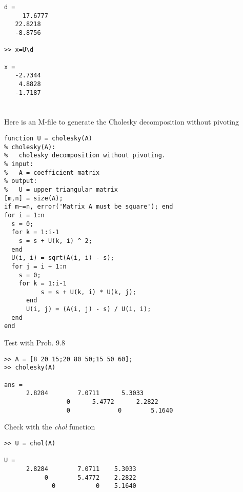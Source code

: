 \documentclass[../main.tex]{subfiles}
\begin{document}
\begin{enumerate}[label=\bfseries(\alph*)]
\begin{lstlisting}[numbers=none]
d =
	 17.6777
   22.8218
   -8.8756
   
>> x=U\d

x =
   -2.7344
    4.8828
   -1.7187
\end{lstlisting}
\bigbreak
\section{}
Here is an M-file to generate the Cholesky decomposition without pivoting
\bigbreak
\begin{lstlisting}[numbers=none]
function U = cholesky(A)
% cholesky(A):
%   cholesky decomposition without pivoting.
% input:
%   A = coefficient matrix
% output:
%   U = upper triangular matrix
[m,n] = size(A);
if m~=n, error('Matrix A must be square'); end
for i = 1:n
  s = 0;
  for k = 1:i-1
    s = s + U(k, i) ^ 2;
  end
  U(i, i) = sqrt(A(i, i) - s);
  for j = i + 1:n
    s = 0;
    for k = 1:i-1
		  s = s + U(k, i) * U(k, j);
 	  end
	  U(i, j) = (A(i, j) - s) / U(i, i);
  end
end 
\end{lstlisting}
\bigbreak
Test with Prob. $9.8$
\bigbreak
\begin{lstlisting}[numbers=none]
>> A = [8 20 15;20 80 50;15 50 60];
>> cholesky(A)

ans =
	  2.8284 		7.0711 		5.3033
 				 0 		5.4772 		2.2822
 				 0 			   0 		5.1640
\end{lstlisting}
\bigbreak
Check with the \textit{chol} function 
\bigbreak
\begin{lstlisting}[numbers=none]
>> U = chol(A)

U =
	  2.8284 		7.0711 	  5.3033
 	  	   0 		5.4772 	  2.2822
 	 	     0 		     0 	  5.1640
\end{lstlisting}


\end{enumerate}
\end{document}
